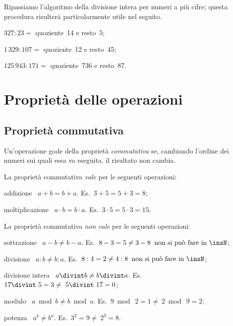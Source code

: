 \ovalbox{\risolvii \ref{ese:1.2}, \ref{ese:1.3}, \ref{ese:1.4}, \ref{ese:1.5}, \ref{ese:1.6}}\vspazio

Ripassiamo l'algoritmo della divisione intera per numeri a più cifre; questa procedura risulterà particolarmente
utile nel seguito.

\begin{center}
 
\end{center}

\begin{enumeratea}
 \item $327:23=$ quoziente~14 e resto~5;
 \item $1\,329:107=$ quoziente~12 e resto~45;
 \item $125\,943:171=$ quoziente~736 e resto~87.
\end{enumeratea}

\ovalbox{\risolvi \ref{ese:1.7}}

\section{Proprietà delle operazioni}
\subsection{Proprietà commutativa}
Un'operazione gode della proprietà \emph{commutativa} se, cambiando l'ordine dei numeri sui quali essa va
eseguita, il risultato non cambia.

La proprietà commutativa \emph{vale} per le seguenti operazioni:
\begin{description*}
 \item[addizione]~$a+b=b+a$. \quad Es.~$3+5=5+3=8$;
 \item[moltiplicazione]~$a\cdot b=b\cdot a$. \quad Es.~$3\cdot 5=5\cdot 3=15$.
\end{description*}

La proprietà commutativa \emph{non vale} per le seguenti operazioni:
\begin{description*}
 \item[sottrazione]~$a-b\neq b-a$. \quad Es.~$8-3=5\neq 3-8\:\text{ non si può fare in }\insN$;
 \item[divisione]~$a:b\neq b:a$. \quad Es.~$8:4=2\neq 4:8\:\text{ non si può fare in }\insN$;
 \item[divisione intera]~$a\divint b\neq b\divint a$. \quad Es.~$17\divint~5=3\neq~5\divint~17=0$;
 \item[modulo]~$a\bmod b\neq b\bmod a$. \quad Es.~$9\bmod~2=1\neq~2\bmod~9=2$;
 \item[potenza]~$a^b\neq b^a$. \quad Es.~$3^2=9\neq~2^3=8$.
\end{description*}

